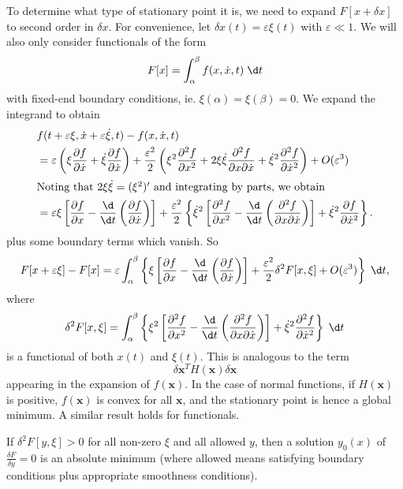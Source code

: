 \documentclass[a4paper]{article}
\begin{document}
To determine what type of stationary point it is, we need to expand $F[x + \delta x]$ to second order in $\delta x$. For convenience, let $\delta x(t) = \varepsilon \xi(t)$ with $\varepsilon \ll 1$. We will also only consider functionals of the form
\[
  F[x] = \int_\alpha^\beta f(x, \dot{x}, t)\;\d t
\]
with fixed-end boundary conditions, ie. $\xi(\alpha) = \xi(\beta) = 0$. We expand the integrand to obtain
\begin{align*}
  &f(t + \varepsilon \xi, \dot{x} + \varepsilon \dot{\xi}, t) - f(x, \dot{x}, t)\\
  &= \varepsilon \left(\xi \frac{\partial f}{\partial \dot{x}} + \dot{\xi}\frac{\partial f}{\partial \dot{x}}\right)  + \frac{\varepsilon^2}{2}\left(\xi^2 \frac{\partial^2 f}{\partial x^2} + 2\xi\dot{\xi} \frac{\partial^2 f}{\partial x \partial \dot{x}} + \dot{\xi}^2 \frac{\partial^2 f}{\partial \dot{x}^2}\right) + O(\varepsilon^3)\\
  \intertext{Noting that $2\xi \dot{\xi} = (\xi^2)'$ and integrating by parts, we obtain}
  &= \varepsilon \xi\left[\frac{\partial f}{\partial x} - \frac{\d}{\d t}\left(\frac{\partial f}{\partial \dot{x}}\right)\right] + \frac{\varepsilon^2}{2}\left\{\dot{\xi}^2\left[\frac{\partial^2 f}{\partial x^2} - \frac{\d}{\d t}\left(\frac{\partial^2 f}{\partial x\partial \dot{x}}\right)\right] + \dot{\xi}^2 \frac{\partial f}{\partial \dot{x}^2}\right\}.
\end{align*}
plus some boundary terms which vanish. So
\[
  F[x + \varepsilon \xi] - F[x] = \varepsilon \int_\alpha^\beta\left\{\xi\left[\frac{\partial f}{\partial x} - \frac{\d}{\d t}\left(\frac{\partial f}{\partial \dot{x}}\right)\right] + \frac{\varepsilon^2}{2}\delta^2 F[x, \xi] + O(\varepsilon^3)\right\}\;\d t,
\]
where
\[
  \delta^2 F[x,  \xi] = \int_\alpha^\beta \left\{\xi^2 \left[\frac{\partial^2 f}{\partial x^2} - \frac{\d}{\d t}\left(\frac{\partial^2 f}{\partial x \partial \dot{x}}\right)\right] + \dot{\xi}^2 \frac{\partial^2 f}{\partial \dot{x}^2}\right\}\;\d t
\]
is a functional of both $x(t)$ and $\xi(t)$. This is analogous to the term
\[
  \delta \mathbf{x}^T H(\mathbf{x})\delta \mathbf{x}
\]
appearing in the expansion of $f(\mathbf{x})$. In the case of normal functions, if $H(\mathbf{x})$ is positive, $f(\mathbf{x})$ is convex for all $\mathbf{x}$, and the stationary point is hence a global minimum. A similar result holds for functionals.

If $\delta^2 F[y, \xi] > 0$ for all non-zero $\xi$ and all allowed $y$, then a solution $y_0(x)$ of $\frac{\delta F}{\delta y} = 0$ is an absolute minimum (where allowed means satisfying boundary conditions plus appropriate smoothness conditions).
\end{document}
